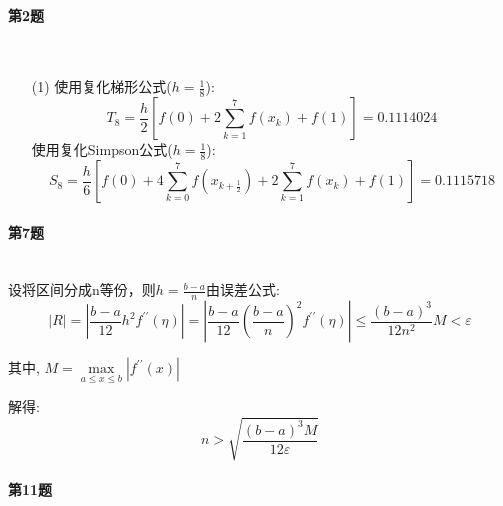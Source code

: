 \documentclass[a4paper]{article}
\begin{document}
\paragraph{第2题}~{}
\\

\begin{enumerate}
    \item [(1)]
    使用复化梯形公式($h=\frac{1}{8}$): 
    \begin{equation}
        T_{8}=\frac{h}{2}\left[f(0)+2 \sum_{k=1}^{7} f\left(x_{k}\right)+f(1)\right]=0.1114024
    \end{equation}
    使用复化Simpson公式($h=\frac{1}{8}$): 
    \begin{equation}
        S_{8}  =\frac{h}{6}\left[f(0)+4 \sum_{k=0}^{7} f\left(x_{k+\frac{1}{2}}\right)+2 \sum_{k=1}^{7} f\left(x_{k}\right)+f(1)\right]  =0.1115718
    \end{equation}
\end{enumerate}

\paragraph{第7题}~{}
\\

设将区间分成n等份，则$h = \frac{b-a}{n}$由误差公式:
\begin{equation}
    |R|=\left|\frac{b-a}{12} h^{2} f^{\prime \prime}(\eta)\right| = \left|\frac{b-a}{12} \left(\frac{b-a}{n}\right)^{2} f^{\prime \prime}(\eta)\right| \leq \frac{(b-a)^{3}}{12 n^{2}} M<\varepsilon
\end{equation} \par
其中, $M=\max \limits_{a \leq x \leq b}\left|f^{\prime \prime}(x)\right|$ \par
解得: 
$$n>\sqrt{\frac{(b-a)^{3} M}{12 \varepsilon}}$$

\newpage
\paragraph{第11题}~{}
\end{document}
